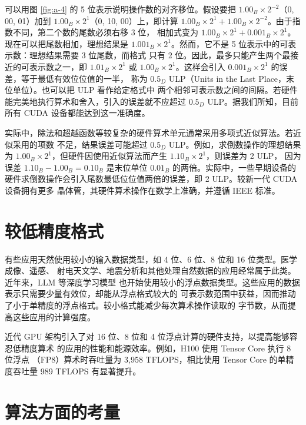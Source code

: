 可以用图 \ref{fig:a-4} 的 5 位表示说明操作数的对齐移位。假设要把
$1.00_B\times2^{-2}$（0, 00, 01）加到 $1.00_B\times2^1$（0, 10, 00）上，即计算
$1.00_B\times2^1+1.00_B\times2^{-2}$。由于指数不同，第二个数的尾数必须右移 3 位，
相加式变为
$1.00_B\times2^1+0.001_B\times2^1$。现在可以把尾数相加，理想结果是
$1.001_B\times2^1$。然而，它不是 5 位表示中的可表示数：理想结果需要 3 位尾数，而格式
只有 2 位。因此，最多只能产生两个最接近的可表示数之一，即 $1.01_B\times2^1$ 或
$1.00_B\times2^1$。这样会引入 $0.001_B\times2^1$ 的误差，等于最低有效位位值的一半，
称为 $0.5_D$ ULP（Units in the Last Place，末位单位）。也可以把 ULP 看作给定格式中
两个相邻可表示数之间的间隔。若硬件能完美地执行算术和舍入，引入的误差就不应超过
$0.5_D$ ULP。据我们所知，目前所有 CUDA 设备都能达到这一准确度。

实际中，除法和超越函数等较复杂的硬件算术单元通常采用多项式近似算法。若近似采用的项数
不足，结果误差可能超过 $0.5_D$ ULP。例如，求倒数操作的理想结果为
$1.00_B\times2^1$，但硬件因使用近似算法而产生 $1.10_B\times2^1$，则误差为 2 ULP，
因为误差 $1.10_B-1.00_B=0.10_B$ 是末位单位 $0.01_B$ 的两倍。实际中，一些早期设备的
硬件求倒数操作会引入尾数最低位位值两倍的误差，即 2 ULP。较新一代 CUDA 设备拥有更多
晶体管，其硬件算术操作在数学上准确，并遵循 IEEE 标准\cite{appa-cuda-fp}。

\section{较低精度格式}
\label{sec:appa-lower-precision}

有些应用天然使用较小的输入数据类型，如 4 位、6 位、8 位和 16 位类型。医学成像、遥感、
射电天文学、地震分析和其他处理自然数据的应用经常属于此类。近年来，LLM 等深度学习模型
也开始使用较小的浮点数据类型。这些应用的数据表示只需要少量有效位，却能从浮点格式较大的
可表示数范围中获益，因而推动了小于单精度的浮点格式。较小格式能减少每次算术操作读取的
字节数，从而提高这些应用的计算强度。

近代 GPU 架构引入了对 16 位、8 位和 4 位浮点计算的硬件支持，以提高能够容忍低精度算术
的应用的性能和能源效率\cite{appa-ocp-mx}。例如，H100 使用 Tensor Core 执行 8 位浮点
（FP8）算术时吞吐量为 3,958 TFLOPS，相比使用 Tensor Core 的单精度吞吐量
989 TFLOPS 有显著提升。

\section{算法方面的考量}
\label{sec:appa-algorithm-considerations}

